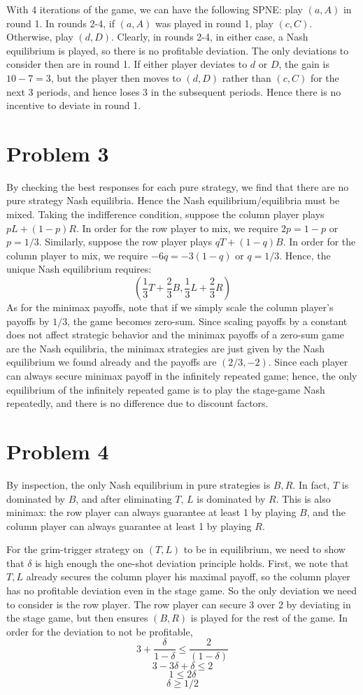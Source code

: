 \documentclass[10pt,letter]{article}
\begin{document}
With 4 iterations of the game, we can have the following SPNE: play $(a,A)$ in round 1. In rounds 2-4, if $(a,A)$ was played in round 1, play $(c,C)$. Otherwise, play $(d,D)$. Clearly, in rounds 2-4, in either case, a Nash equilibrium is played, so there is no profitable deviation. The only deviations to consider then are in round 1. If either player deviates to $d$ or $D$, the gain is $10-7 = 3$, but the player then moves to $(d,D)$ rather than $(c,C)$ for the next 3 periods, and hence loses 3 in the subsequent periods. Hence there is no incentive to deviate in round 1.
\section*{Problem 3}
By checking the best responses for each pure strategy, we find that there are no pure strategy Nash equilibria. Hence the Nash equilibrium/equilibria must be mixed. Taking the indifference condition, suppose the column player plays $pL + (1-p)R$.
In order for the row player to mix, we require $2p = 1 - p$ or $p = 1/3$. Similarly, suppose the row player plays $qT + (1-q)B$. In order for the column player to mix, we require $-6q = -3(1-q)$ or $q = 1/3$. Hence, the unique Nash equilibrium requires:
\[ \left( \frac{1}{3}T + \frac{2}{3}B, \frac{1}{3}L + \frac{2}{3}R  \right) \]
As for the minimax payoffs, note that if we simply scale the column player's payoffs by $1/3$, the game becomes zero-sum. Since scaling payoffs by a constant does not affect strategic behavior and the minimax payoffs of a zero-sum game are the Nash equilibria, the minimax strategies are just given by the Nash equilibrium we found already and the payoffs are $(2/3, -2)$. Since each player can always secure minimax payoff in the infinitely repeated game; hence, the only equilibrium of the infinitely repeated game is to play the stage-game Nash repeatedly, and there is no difference due to discount factors.
\section*{Problem 4}
By inspection, the only Nash equilibrium in pure strategies is $B,R$. In fact, $T$ is dominated by $B$, and after eliminating $T$, $L$ is dominated by $R$. This is also minimax: the row player can always guarantee at least 1 by playing $B$, and the column player can always guarantee at least 1 by playing $R$.

For the grim-trigger strategy on $(T,L)$ to be in equilibrium, we need to show that $\delta$ is high enough the one-shot deviation principle holds. First, we note that $T,L$ already secures the column player his maximal payoff, so the column player has no profitable deviation even in the stage game. So the only deviation we need to consider is the row player. The row player can secure 3 over 2 by deviating in the stage game, but then ensures $(B,R)$ is played for the rest of the game. In order for the deviation to not be profitable,
\[ 3 + \frac{\delta}{1-\delta} \le \frac{2}{(1-\delta)} \]
\[ 3 - 3 \delta + \delta \le 2 \]
\[1 \le 2 \delta  \]
\[ \delta \ge 1/2 \]
\end{document}

